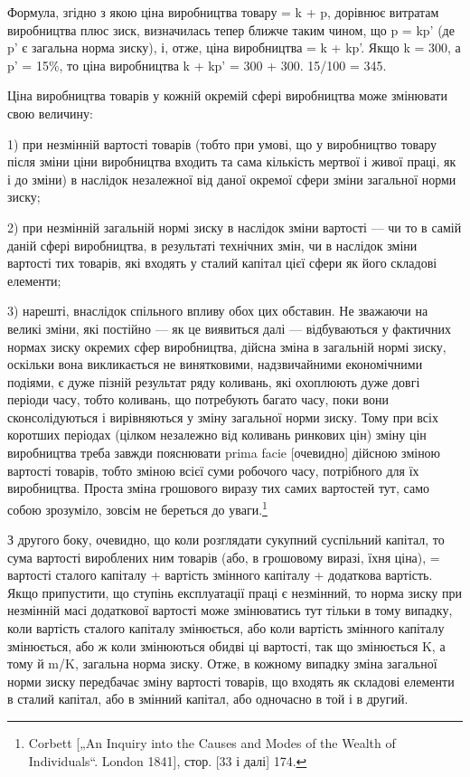 Формула, згідно з якою ціна виробництва товару = k + p,
дорівнює витратам виробництва плюс зиск, визначилась тепер
ближче таким чином, що p = kp' (де p' є загальна норма зиску),
і, отже, ціна виробництва = k + kp'. Якщо k = 300, а p' = 15\%,
то ціна виробництва k + kp' = 300 + 300. 15/100 = 345.

Ціна виробництва товарів у кожній окремій сфері виробництва може змінювати свою величину:

1) при незмінній вартості товарів (тобто при умові, що у виробництво товару після зміни ціни
виробництва входить та сама
кількість мертвої і живої праці, як і до зміни) в наслідок незалежної від даної окремої сфери зміни
загальної норми зиску;

2) при незмінній загальній нормі зиску в наслідок зміни вартості — чи то в самій даній сфері
виробництва, в результаті
технічних змін, чи в наслідок зміни вартості тих товарів, які
входять у сталий капітал цієї сфери як його складові елементи;

3) нарешті, внаслідок спільного впливу обох цих обставин.
Не зважаючи на великі зміни, які постійно — як це виявиться
далі — відбуваються у фактичних нормах зиску окремих сфер
виробництва, дійсна зміна в загальній нормі зиску, оскільки
вона викликається не винятковими, надзвичайними економічними
подіями, є дуже пізній результат ряду коливань, які охоплюють
дуже довгі періоди часу, тобто коливань, що потребують багато часу, поки вони сконсолідуються і
вирівняються у зміну
загальної норми зиску. Тому при всіх коротших періодах (цілком незалежно від коливань ринкових цін)
зміну цін виробництва
треба завжди пояснювати prima facie [очевидно] дійсною зміною
вартості товарів, тобто зміною всієї суми робочого часу, потрібного для їх виробництва. Проста зміна
грошового виразу тих самих вартостей тут, само собою зрозуміло, зовсім не береться до уваги.\footnote{
Corbett [„An Inquiry into the Causes and Modes of the Wealth of Individuals“.
London 1841], стор. [33 і далі] 174.
}

З другого боку, очевидно, що коли розглядати сукупний
суспільний капітал, то сума вартості вироблених ним товарів
(або, в грошовому виразі, їхня ціна), = вартості сталого капіталу + вартість змінного капіталу +
додаткова вартість. Якщо припустити, що ступінь експлуатації праці є незмінний, то норма зиску
при незмінній масі додаткової вартості може змінюватись тут
тільки в тому випадку, коли вартість сталого капіталу змінюється,
або коли вартість змінного капіталу змінюється, або ж коли змінюються обидві ці вартості, так що
змінюється K, а тому й m/K, загальна норма зиску. Отже, в кожному випадку зміна загальної
норми зиску передбачає зміну вартості товарів, що входять як
складові елементи в сталий капітал, або в змінний капітал, або
одночасно в той і в другий.